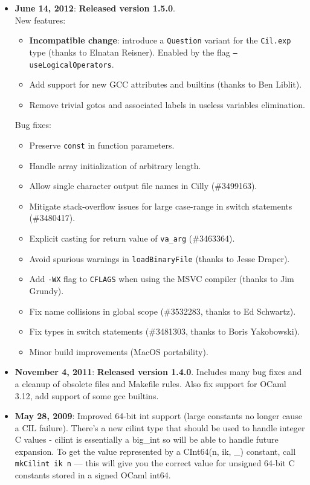 \documentclass[letterpaper]{article}
\def\t#1{{\tt #1}}
\begin{document}
\begin{itemize}
\item{\bf June 14, 2012}: {\bf Released version 1.5.0}.\\
    New features:
    \begin{itemize}
        \item {\bf Incompatible change}: introduce a \t{Question} variant for
            the \t{Cil.exp} type (thanks to Elnatan Reisner).  Enabled by the
            flag \t{--useLogicalOperators}.
        \item Add support for new GCC attributes and builtins (thanks to Ben
            Liblit).
        \item Remove trivial gotos and associated labels in useless variables
            elimination.
    \end{itemize}
    Bug fixes:
    \begin{itemize}
        \item Preserve \t{const} in function parameters.
        \item Handle array initialization of arbitrary length.
        \item Allow single character output file names in Cilly (\#3499163).
        \item Mitigate stack-overflow issues for large case-range in switch statements (\#3480417).
        \item Explicit casting for return value of \t{va\_arg} (\#3463364).
        \item Avoid spurious warnings in \t{loadBinaryFile} (thanks to Jesse Draper).
        \item Add \t{-WX} flag to \t{CFLAGS} when using the MSVC compiler (thanks to Jim
            Grundy).
        \item Fix name collisions in global scope (\#3532283, thanks to Ed Schwartz).
        \item Fix types in switch statements (\#3481303, thanks to Boris
            Yakobowski).
        \item Minor build improvements (MacOS portability).
    \end{itemize}

\item {\bf November 4, 2011}: {\bf Released version 1.4.0}.  Includes many bug
    fixes and a cleanup of obsolete files and Makefile rules.  Also fix
    support for OCaml 3.12, add support of some gcc builtins.
\item {\bf May 28, 2009}: Improved 64-bit int support (large constants
  no longer cause a CIL failure). There's a new cilint type that
  should be used to handle integer C values - cilint is essentially a
  big\_int so will be able to handle future expansion. To get the value
  represented by a CInt64(n, ik, \_) constant, call \t{mkCilint ik n}
  --- this will give you the correct value for unsigned 64-bit C
  constants stored in a signed OCaml int64.


\end{itemize}
\end{document}
